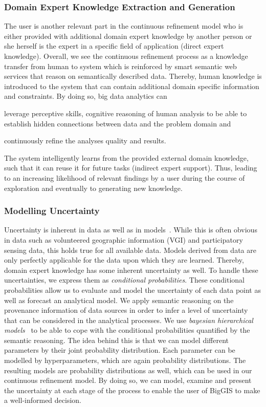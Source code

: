 \documentclass{sig-alternate-05-2015}
\begin{document}
\subsubsection{Domain Expert Knowledge Extraction and Generation}
The user is another relevant part in the continuous refinement model who is
either provided with additional domain expert knowledge by another person or
she herself is the expert in a specific field of application (direct expert
knowledge). Overall, we see the continuous refinement process as a knowledge
transfer from human to system which is reinforced by smart semantic web
services that reason on semantically described data. Thereby, human knowledge
is introduced to the system that can contain additional domain specific
information and constraints. By doing so, big data analytics can
\begin{inparaenum}[(1)]
 	\item leverage perceptive skills, cognitive reasoning of human analysis
to be able to establish hidden connections between data and the problem domain
and
	\item continuously refine the analyses quality and results.
\end{inparaenum}
The system intelligently learns from the provided external domain knowledge,
such that it can reuse it for future tasks (indirect expert support). Thus,
leading to an increasing likelihood of relevant findings by a user during the
course of exploration and eventually to generating new knowledge.


\subsubsection{Modelling Uncertainty}
Uncertainty is inherent in data as well as in
models~\cite{cressie2015statistics}. While this is often obvious in data such
as volunteered geographic information (VGI) and participatory sensing data,
this holds true for all available data. Models derived from data
are only perfectly applicable for the data upon which they are learned.
Thereby, domain expert knowledge has some inherent uncertainty as well. To
handle these uncertainties, we express them as \textit{conditional
probabilities}. These conditional probabilities allow us to evaluate and model
the uncertainty of each data point as well as forecast an analytical model. We
apply semantic reasoning on the provenance information of data sources in order
to infer a level of uncertainty that can be considered in the analytical
processes. We use \textit{bayesian hierarchical
models}~\cite{cressie2015statistics} to be able to cope with the conditional
probabilities quantified by the semantic reasoning. The idea behind this is
that we can model different parameters by their joint probability distribution.
Each parameter can be modelled by hyperparameters, which are again probability
distributions. The resulting models are probability distributions as well,
which can be used in our continuous refinement model. By doing so, we can
model, examine and present the uncertainty at each stage of the process to
enable the user of BigGIS to make a well-informed decision.
\end{document}
